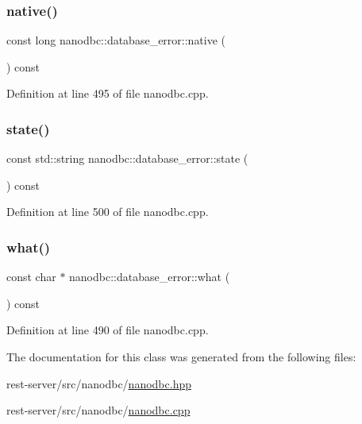 \subsubsection{\texorpdfstring{native()}{native()}}
{\footnotesize\ttfamily const long nanodbc\+::database\+\_\+error\+::native (\begin{DoxyParamCaption}{ }\end{DoxyParamCaption}) const\hspace{0.3cm}{\ttfamily [noexcept]}}



Definition at line 495 of file nanodbc.\+cpp.

\mbox{\label{classnanodbc_1_1database__error_a49ebd24a0598597e12a380e22fec357e}} 
\subsubsection{\texorpdfstring{state()}{state()}}
{\footnotesize\ttfamily const std\+::string nanodbc\+::database\+\_\+error\+::state (\begin{DoxyParamCaption}{ }\end{DoxyParamCaption}) const\hspace{0.3cm}{\ttfamily [noexcept]}}



Definition at line 500 of file nanodbc.\+cpp.

\mbox{\label{classnanodbc_1_1database__error_a270ae2547cf357ccd95225d957638ae9}} 
\subsubsection{\texorpdfstring{what()}{what()}}
{\footnotesize\ttfamily const char $\ast$ nanodbc\+::database\+\_\+error\+::what (\begin{DoxyParamCaption}{ }\end{DoxyParamCaption}) const\hspace{0.3cm}{\ttfamily [noexcept]}}



Definition at line 490 of file nanodbc.\+cpp.



The documentation for this class was generated from the following files\+:\begin{DoxyCompactItemize}
\item 
rest-\/server/src/nanodbc/\mbox{\hyperlink{nanodbc_8hpp}{nanodbc.\+hpp}}\item 
rest-\/server/src/nanodbc/\mbox{\hyperlink{nanodbc_8cpp}{nanodbc.\+cpp}}\end{DoxyCompactItemize}
